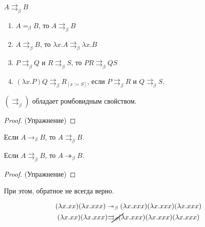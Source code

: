 \begin{definition}
    $A \rightrightarrows_{\beta} B$
    \begin{enumerate}
        \item $A =_{\beta} B$, то $A \rightrightarrows_{\beta}B$
        \item $A \rightrightarrows_{\beta} B$, то $\lambda x.A \rightrightarrows_{\beta} \lambda x . B$
        \item $P \rightrightarrows_{\beta} Q$ и $R \rightrightarrows_{\beta} S$, то $PR \rightrightarrows_{\beta} QS$
        \item $(\lambda x . P) Q \rightrightarrows_{\beta} R_{[x:=S]}$, если 
            $P \rightrightarrows_{\beta}R$ и $Q \rightrightarrows_{\beta} S$.
    \end{enumerate}
\end{definition}

\begin{statement} \label{st-star}
    $(\rightrightarrows_{\beta})$ обладает ромбовидным свойством.
\end{statement}

\begin{proof}
    (Упражнение) \todo %
\end{proof}

\begin{statement} \label{st-A}
    Если $A \rightarrow_{\beta} B$, то $A \rightrightarrows_{\beta} B$.
\end{statement}

\begin{statement} \label{st-B}
    Если $A \rightrightarrows_{\beta} B$, то $A \twoheadrightarrow_{\beta} B$.
\end{statement}

\begin{proof}
    (Упражнение) \todo %
\end{proof}

При этом, обратное не всегда верно.

\begin{example}
    \begin{gather*}
        (\lambda x . x x) (\lambda x . x x x) \twoheadrightarrow_{\beta} (\lambda x . x x x)(\lambda x . x x x)(\lambda x . x x x) \\
        (\lambda x . x x) (\lambda x . x x x) \cancel{\rightrightarrows_{\beta}} (\lambda x . x x x)(\lambda x . x x x)(\lambda x . x x x)
    \end{gather*}
\end{example}

